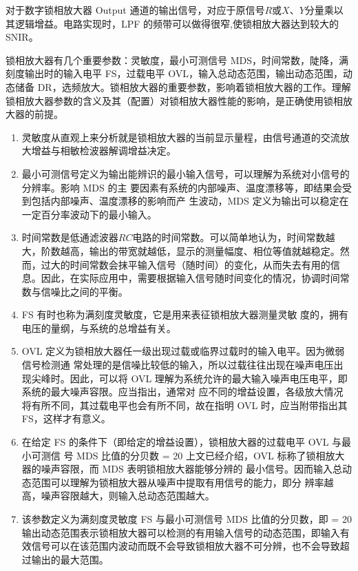 \documentclass[11pt,a4paper]{ctexart}
\begin{document}
对于数字锁相放大器 Output 通道的输出信号，对应于原信号$R$或$X$、$Y$分量乘以其逻辑增益。电路实现时，LPF 的频带可以做得很窄,使锁相放大器达到较大的 SNIR。
\par
锁相放大器有几个重要参数：灵敏度，最小可测信号 MDS，时间常数，陡降，满刻度输出时的输入电平 FS，过载电平 OVL，输入总动态范围，输出动态范围，动态储备 DR，选频放大。锁相放大器的重要参数，影响着锁相放大器的工作。理解锁相放大器参数的含义及其（配置）对锁相放大器性能的影响，是正确使用锁相放大器的前提。
\begin{enumerate} 
\item 灵敏度从直观上来分析就是锁相放大器的当前显示量程，由信号通道的交流放大增益与相敏检波器解调增益决定。
\item 最小可测信号定义为输出能辨识的最小输入信号，可以理解为系统对小信号的分辨率。影响 MDS 的主
要因素有系统的内部噪声、温度漂移等，即结果会受到包括内部噪声、温度漂移的影响而产
生波动，MDS 定义为输出可以稳定在一定百分率波动下的最小输入。
\item 时间常数是低通滤波器$RC$电路的时间常数。可以简单地认为，时间常数越大，阶数越高，输出的带宽就越低，显示的测量幅度、相位等值就越稳定。然而，过大的时间常数会抹平输入信号（随时间）的变化，从而失去有用的信息。因此，在实际应用中，需要根据输入信号随时间变化的情况，协调时间常数与信噪比之间的平衡。
\item  FS 有时也称为满刻度灵敏度，它是用来表征锁相放大器测量灵敏 度的，拥有电压的量纲，与系统的总增益有关。
\item OVL 定义为锁相放大器任一级出现过载或临界过载时的输入电平。因为微弱信号检测通
常处理的是信噪比较低的输入，所以过载往往出现在噪声电压出现尖峰时。因此，可以将
OVL 理解为系统允许的最大输入噪声电压电平，即系统的最大噪声容限。应当指出，通常对
应不同的增益设置，各级放大情况将有所不同，其过载电平也会有所不同，故在指明 OVL
时，应当附带指出其 FS，这样才有意义。
\item  在给定 FS 的条件下（即给定的增益设置），锁相放大器的过载电平 OVL 与最小可测信
 号 MDS 比值的分贝数
 \beq
{} = 20   
\eeq
上文已经介绍，OVL 标称了锁相放大器的噪声容限，而 MDS 表明锁相放大器能够分辨的
最小信号。因而输入总动态范围可以理解为锁相放大器从噪声中提取有用信号的能力，即分
辨率越高，噪声容限越大，则输入总动态范围越大。
 \item 该参数定义为满刻度灵敏度 FS 与最小可测信号 MDS 比值的分贝数，即
 \beq
  = 20   
\eeq
 输出动态范围表示锁相放大器可以检测的有用输入信号的动态范围，即输入有效信号可以在该范围内波动而既不会导致锁相放大器不可分辨，也不会导致超过输出的最大范围。

\end{enumerate}
\end{document}

